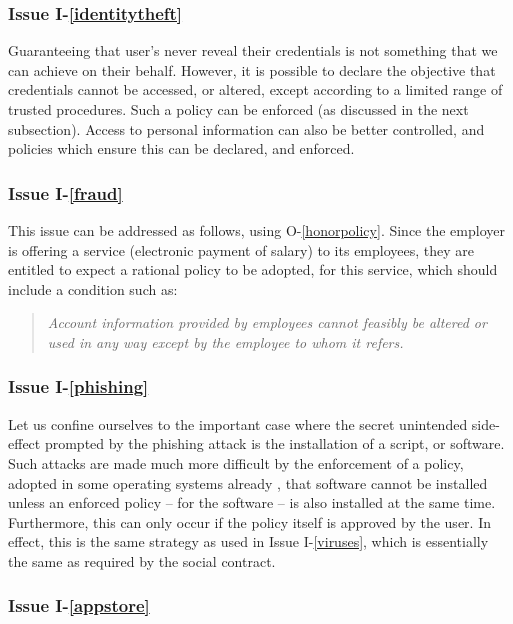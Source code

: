 \subsubsection*{Issue I-\ref{identitytheft}}\label{identitytheftsol}

Guaranteeing that user's never reveal their credentials is not something
that we can achieve on their behalf. However, it is possible to declare
the objective that credentials cannot be accessed, or altered, except
according to a limited range of trusted procedures. Such a policy can
be enforced (as discussed in the next subsection). Access to personal
information can also be better controlled, and policies which ensure
this can be declared, and enforced.

\subsubsection*{Issue I-\ref{fraud}}\label{fraudsol}

This issue can be addressed as follows, using O-\ref{honorpolicy}. Since
the employer is offering a service (electronic payment of salary) to its
employees, they are entitled to expect a rational policy to be adopted,
for this service, which should include a condition such as:

\begin{quote}\em
Account information provided by employees cannot feasibly be altered or 
used in any way except by the employee to whom it refers.
\end{quote}


\subsubsection*{Issue I-\ref{phishing}}\label{phishingsol}

Let us confine ourselves to the important case where the secret unintended
side-effect prompted by the phishing attack is the installation
of a script, or software. Such attacks are made much more difficult
by the enforcement of a policy, adopted in some operating systems already
\cite{SELinux}, that software cannot be installed unless an enforced
policy -- for the software -- is also installed at the same time. Furthermore,
this can only occur if the policy itself is approved by the user. In effect, 
this is the same strategy as used in Issue I-\ref{viruses}, which is
essentially the same as required by the social contract.

\subsubsection*{Issue I-\ref{appstore}}\label{appstoresol}

